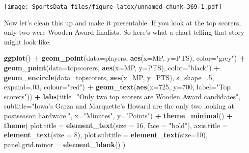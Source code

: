 \documentclass[
]{book}
\newenvironment{Shaded}{\begin{snugshade}}{\end{snugshade}}
\newcommand{\DataTypeTok}[1]{\textcolor[rgb]{0.13,0.29,0.53}{#1}}
\newcommand{\DecValTok}[1]{\textcolor[rgb]{0.00,0.00,0.81}{#1}}
\newcommand{\KeywordTok}[1]{\textcolor[rgb]{0.13,0.29,0.53}{\textbf{#1}}}
\newcommand{\NormalTok}[1]{#1}
\newcommand{\OperatorTok}[1]{\textcolor[rgb]{0.81,0.36,0.00}{\textbf{#1}}}
\newcommand{\StringTok}[1]{\textcolor[rgb]{0.31,0.60,0.02}{#1}}
\begin{document}
\texttt{[image: SportsData\_files/figure-latex/unnamed-chunk-369-1.pdf]}

Now let's clean this up and make it presentable. If you look at the top scorers, only two were Wooden Award finalists. So here's what a chart telling that story might look like.

\begin{Shaded}
\begin{Highlighting}[]
\KeywordTok{ggplot}\NormalTok{() }\OperatorTok{+}\StringTok{ }
\StringTok{  }\KeywordTok{geom_point}\NormalTok{(}\DataTypeTok{data=}\NormalTok{players, }\KeywordTok{aes}\NormalTok{(}\DataTypeTok{x=}\NormalTok{MP, }\DataTypeTok{y=}\NormalTok{PTS), }\DataTypeTok{color=}\StringTok{"grey"}\NormalTok{) }\OperatorTok{+}\StringTok{ }
\StringTok{  }\KeywordTok{geom_point}\NormalTok{(}\DataTypeTok{data=}\NormalTok{topscorers, }\KeywordTok{aes}\NormalTok{(}\DataTypeTok{x=}\NormalTok{MP, }\DataTypeTok{y=}\NormalTok{PTS), }\DataTypeTok{color=}\StringTok{"black"}\NormalTok{) }\OperatorTok{+}\StringTok{ }
\StringTok{  }\KeywordTok{geom_encircle}\NormalTok{(}\DataTypeTok{data=}\NormalTok{topscorers, }\KeywordTok{aes}\NormalTok{(}\DataTypeTok{x=}\NormalTok{MP, }\DataTypeTok{y=}\NormalTok{PTS), }\DataTypeTok{s_shape=}\NormalTok{.}\DecValTok{5}\NormalTok{, }\DataTypeTok{expand=}\NormalTok{.}\DecValTok{03}\NormalTok{, }\DataTypeTok{colour=}\StringTok{"red"}\NormalTok{) }\OperatorTok{+}
\StringTok{  }\KeywordTok{geom_text}\NormalTok{(}\KeywordTok{aes}\NormalTok{(}\DataTypeTok{x=}\DecValTok{725}\NormalTok{, }\DataTypeTok{y=}\DecValTok{700}\NormalTok{, }\DataTypeTok{label=}\StringTok{"Top scorers"}\NormalTok{)) }\OperatorTok{+}\StringTok{ }
\StringTok{  }\KeywordTok{labs}\NormalTok{(}\DataTypeTok{title=}\StringTok{"Only two top scorers are Wooden Award candidates"}\NormalTok{, }\DataTypeTok{subtitle=}\StringTok{"Iowa's Garza and Marquette's Howard are the only two looking at postseason hardware."}\NormalTok{, }\DataTypeTok{x=}\StringTok{"Minutes"}\NormalTok{, }\DataTypeTok{y=}\StringTok{"Points"}\NormalTok{) }\OperatorTok{+}\StringTok{ }
\StringTok{  }\KeywordTok{theme_minimal}\NormalTok{() }\OperatorTok{+}\StringTok{ }
\StringTok{  }\KeywordTok{theme}\NormalTok{(}
    \DataTypeTok{plot.title =} \KeywordTok{element_text}\NormalTok{(}\DataTypeTok{size =} \DecValTok{16}\NormalTok{, }\DataTypeTok{face =} \StringTok{"bold"}\NormalTok{),}
    \DataTypeTok{axis.title =} \KeywordTok{element_text}\NormalTok{(}\DataTypeTok{size =} \DecValTok{8}\NormalTok{), }
    \DataTypeTok{plot.subtitle =} \KeywordTok{element_text}\NormalTok{(}\DataTypeTok{size=}\DecValTok{10}\NormalTok{), }
    \DataTypeTok{panel.grid.minor =} \KeywordTok{element_blank}\NormalTok{()}
\NormalTok{    )}
\end{Highlighting}
\end{Shaded}
\end{document}

